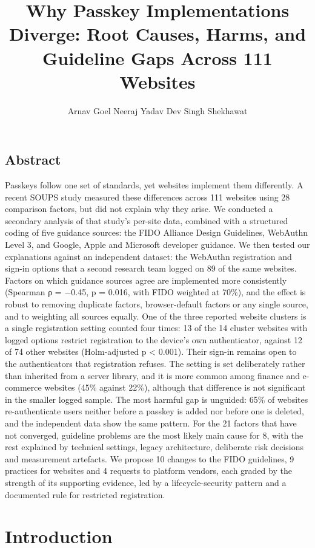 \documentclass[letterpaper,twocolumn,10pt]{article}
\date{}
\title{\Large\bfseries Why Passkey Implementations Diverge: Root Causes, Harms, and\\Guideline Gaps Across 111 Websites}
\author{Arnav Goel \qquad Neeraj Yadav \qquad Dev Singh Shekhawat\\\relax {\normalsize Department of Computer Science and Engineering, Shiv Nadar University}}
\begin{document}
\maketitle
\thispagestyle{empty}
\subsection*{Abstract}
Passkeys follow one set of standards, yet websites implement them differently. A recent SOUPS study measured these differences across 111 websites using 28 comparison factors, but did not explain why they arise. We conducted a secondary analysis of that study's per-site data, combined with a structured coding of five guidance sources: the FIDO Alliance Design Guidelines, WebAuthn Level 3, and Google, Apple and Microsoft developer guidance. We then tested our explanations against an independent dataset: the WebAuthn registration and sign-in options that a second research team logged on 89 of the same websites. Factors on which guidance sources agree are implemented more consistently (Spearman ρ = −0.45, p = 0.016, with FIDO weighted at 70\%), and the effect is robust to removing duplicate factors, browser-default factors or any single source, and to weighting all sources equally. One of the three reported website clusters is a single registration setting counted four times: 13 of the 14 cluster websites with logged options restrict registration to the device's own authenticator, against 12 of 74 other websites (Holm-adjusted p \textless{} 0.001). Their sign-in remains open to the authenticators that registration refuses. The setting is set deliberately rather than inherited from a server library, and it is more common among finance and e-commerce websites (45\% against 22\%), although that difference is not significant in the smaller logged sample. The most harmful gap is unguided: 65\% of websites re-authenticate users neither before a passkey is added nor before one is deleted, and the independent data show the same pattern. For the 21 factors that have not converged, guideline problems are the most likely main cause for 8, with the rest explained by technical settings, legacy architecture, deliberate risk decisions and measurement artefacts. We propose 10 changes to the FIDO guidelines, 9 practices for websites and 4 requests to platform vendors, each graded by the strength of its supporting evidence, led by a lifecycle-security pattern and a documented rule for restricted registration.

\section{Introduction}
\end{document}
